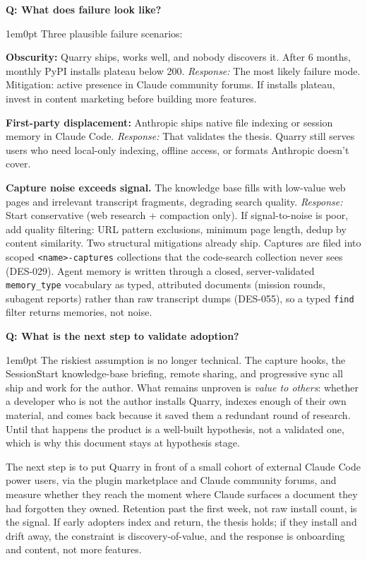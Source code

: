 \documentclass[11pt,letterpaper]{article}
\newcounter{faqnum}
\newenvironment{faqpair}[1]{%
  \needspace{4\baselineskip}%
  \vspace{0.5em}%
  \refstepcounter{faqnum}%
  \noindent\textbf{\color{SectionBlue}Q\thefaqnum: #1}\par\nopagebreak[4]%
  \vspace{0.2em}%
  \begin{adjustwidth}{1em}{0pt}%
  \setlength{\parindent}{0pt}%
}{%
  \end{adjustwidth}%
  \vspace{0.5em}%
}
\begin{document}
\begin{faqpair}{What does failure look like?}\label{faq:failure}
  Three plausible failure scenarios:

  \textbf{Obscurity:} Quarry ships, works well, and nobody discovers it. After
  6 months, monthly PyPI installs plateau below 200. \textit{Response:} The
  most likely failure mode. Mitigation: active presence in Claude community
  forums. If installs plateau, invest in content marketing before building more
  features.

  \textbf{First-party displacement:} Anthropic ships native file indexing or
  session memory in Claude Code. \textit{Response:} That validates the thesis.
  Quarry still serves users who need local-only indexing, offline access, or
  formats Anthropic doesn't cover.

  \textbf{Capture noise exceeds signal.} The knowledge base fills with
  low-value web pages and irrelevant transcript fragments, degrading search
  quality. \textit{Response:} Start conservative (web research + compaction
  only). If signal-to-noise is poor, add quality filtering: URL pattern
  exclusions, minimum page length, dedup by content similarity. Two
  structural mitigations already ship. Captures are filed into scoped
  \texttt{<name>-captures} collections that the code-search collection never
  sees (DES-029). Agent memory is written through a closed, server-validated
  \texttt{memory\_type} vocabulary as typed, attributed documents (mission
  rounds, subagent reports) rather than raw transcript dumps (DES-055), so a
  typed \texttt{find} filter returns memories, not noise.
\end{faqpair}

\begin{faqpair}{What is the next step to validate adoption?}\label{faq:next-validation}
  The riskiest assumption is no longer technical. The capture hooks, the
  SessionStart knowledge-base briefing, remote sharing, and progressive sync all
  ship and work for the author. What remains unproven is \emph{value to others}:
  whether a developer who is not the author installs Quarry, indexes enough of
  their own material, and comes back because it saved them a redundant round of
  research. Until that happens the product is a well-built hypothesis, not a
  validated one, which is why this document stays at hypothesis stage.

  The next step is to put Quarry in front of a small cohort of external Claude
  Code power users, via the plugin marketplace and Claude community
  forums, and measure whether they reach the moment where Claude surfaces a
  document they had forgotten they owned. Retention past the first week, not raw
  install count, is the signal. If early adopters index and return, the thesis
  holds; if they install and drift away, the constraint is discovery-of-value,
  and the response is onboarding and content, not more features.
\end{faqpair}
\end{document}
